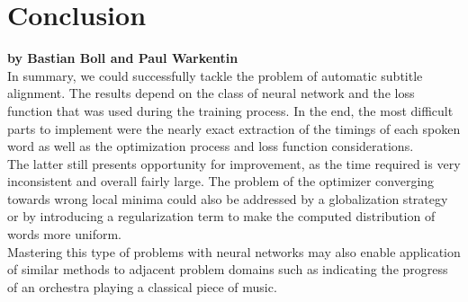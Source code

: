 \chapter{Conclusion}

\textbf{by Bastian Boll and Paul Warkentin} \\

In summary, we could successfully tackle the problem of automatic subtitle alignment. The results depend on the class of neural network and the loss function that was used during the training process. In the end, the most difficult parts to implement were the nearly exact extraction of the timings of each spoken word as well as the optimization process and loss function considerations. \\

The latter still presents  opportunity for improvement, as the time required is very inconsistent and overall fairly large. The problem of the optimizer converging towards wrong local minima could also be addressed by a globalization strategy or by introducing a regularization term to make the computed distribution of words more uniform.\\

Mastering this type of problems with neural networks may also enable application of similar methods to adjacent problem domains such as indicating the progress of an orchestra playing a classical piece of music.
